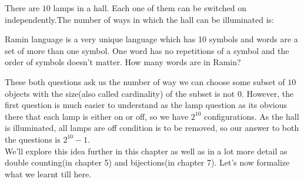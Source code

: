\begin{example}
There are $10$ lamps in a hall. Each one of them can be switched on independently.The number of ways in which the hall can be illuminated is:    
\end{example}
\begin{example}
    Ramin language is a very unique language which has 10 symbols and words are a set of more than one symbol. One word has no repetitions of a symbol and the order of symbols doesn't matter. How many words are in Ramin?
\end{example}
These both questions ask us the number of way we can choose some subset of $10$ objects with the size(also called cardinality) of the subset is not $0$. However, the first question is much easier to understand as the lamp question as its obvious there that each lamp is either on or off, so we have $2^{10}$ configurations. As the hall is illuminated, all lamps are off condition is to be removed, so our answer to both the questions is $2^{10}-1$.\\
We'll explore this idea further in this chapter as well as in a lot more detail as double counting(in chapter 5) and bijections(in chapter 7). Let's now formalize what we learnt till here.

